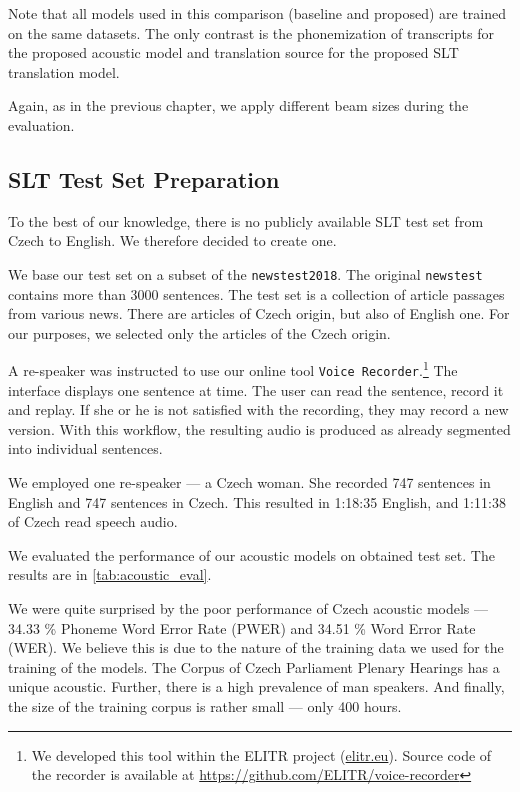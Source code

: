Note that all models used in this comparison (baseline and proposed) are trained on the same datasets. The only contrast is the phonemization of transcripts for the proposed acoustic model and translation source for the proposed SLT translation model.

Again, as in the previous chapter, we apply different beam sizes during the evaluation.

\subsection{SLT Test Set Preparation}
\label{read-newstest}
To the best of our knowledge, there is no publicly available SLT test set from Czech to English. We therefore decided to create one.

We base our test set on a subset of the \texttt{newstest2018}. The original \texttt{news\-test} contains more than 3000 sentences. The test set is a collection of article passages from various news. There are articles of Czech origin, but also of English one. For our purposes, we selected only the articles of the Czech origin. 

A re-speaker was instructed to use our online tool \texttt{Voice Recorder}.\footnote{We developed this tool within the ELITR project (\url{elitr.eu}). Source code of the recorder is available at \url{https://github.com/ELITR/voice-recorder}} The interface displays one sentence at time. The user can read the sentence, record it and replay. If she or he is not satisfied with the recording, they may record a new version. With this workflow, the resulting audio is produced as already segmented into individual sentences.

We employed one re-speaker --- a Czech woman. She recorded 747 sentences in English and 747 sentences in Czech. This resulted in 1:18:35 English, and 1:11:38 of Czech read speech audio.

We evaluated the performance of our acoustic models on obtained test set. The results are in \cref{tab:acoustic_eval}. 

We were quite surprised by the poor performance of Czech acoustic models --- 34.33 \% Phoneme Word Error Rate (PWER) and 34.51 \% Word Error Rate (WER). We believe this is due to the nature of the training data we used for the training of the models. The Corpus of Czech Parliament Plenary Hearings has a unique acoustic. Further, there is a high prevalence of man speakers. And finally, the size of the training corpus is rather small --- only 400 hours.

